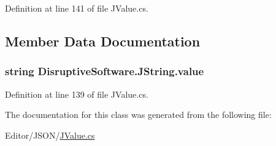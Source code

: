 Definition at line 141 of file J\+Value.\+cs.



\subsection{Member Data Documentation}
\hypertarget{class_disruptive_software_1_1_j_string_a4cc207c65aecca215478cd28e5632030}{
\subsubsection[{value}]{\setlength{\rightskip}{0pt plus 5cm}string Disruptive\+Software.\+J\+String.\+value}}\label{class_disruptive_software_1_1_j_string_a4cc207c65aecca215478cd28e5632030}


Definition at line 139 of file J\+Value.\+cs.



The documentation for this class was generated from the following file\+:\begin{DoxyCompactItemize}
\item 
Editor/\+J\+S\+O\+N/\hyperlink{_j_value_8cs}{J\+Value.\+cs}\end{DoxyCompactItemize}
